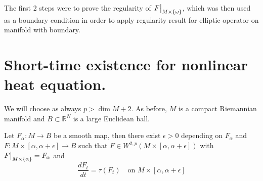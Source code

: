 \begin{remark}
The first 2 steps were to prove the regularity of \(\restr{F}{M\times
\{\omega\}}\), which was then used as a boundary condition in
order to apply regularity result for elliptic operator on manifold with boundary.
\end{remark}




\section{Short-time existence for nonlinear heat equation.}
\label{sec:org05e16d6}
We will choose as always \(p > \dim M +2\). As before, \(M\) is a compact Riemannian
manifold and \(B\subset \mathbb{R}^N\) is a large Euclidean ball.

\begin{theorem}
\label{thm:short-time}
Let \(F_\alpha: M \longrightarrow  B\) be a smooth map, then there exist \(\epsilon>0\) depending on \(F_\alpha\) and \(F: M\times [\alpha,\alpha + \epsilon] \longrightarrow
B\) such that \(F\in W^{2,p}(M\times [\alpha,\alpha+\epsilon])\) with \(\restr{F}{M\times \{\alpha\}} = F_\alpha\) and
\[
 \frac{d F_t}{dt} = \tau(F_t) \quad \text{on } M\times [\alpha,\alpha +\epsilon]
\]
\end{theorem}

